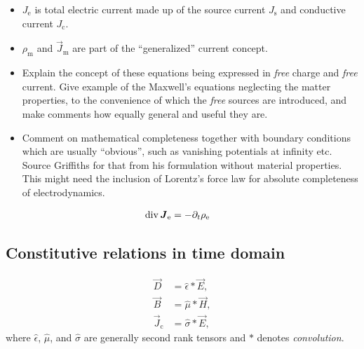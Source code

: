 \documentclass[11pt,a4paper,twoside,openany]{report}
\begin{document}
        \begin{itemize}
            \item $J_{\mathrm e}$ is total electric current made up of the source current $J_{\mathrm s}$ and conductive current $J_{\mathrm c}$. 
            \item $\rho_{\mathrm m}$ and $\vec J_{\mathrm m}$ are part of the \enquote{generalized} current concept.
            \item Explain the concept of these equations being expressed in \emph{free} charge and \emph{free} current. Give example of the Maxwell's equations neglecting the matter properties, to the convenience of which the \emph{free} sources are introduced, and make comments how equally general and useful they are.
            \item Comment on mathematical completeness together with boundary conditions which are usually \enquote{obvious}, such as vanishing potentials at infinity etc. Source Griffiths for that from his formulation without material properties. This might need the inclusion of Lorentz's force law for absolute completeness of electrodynamics.
        \end{itemize}
        
        \begin{align}
            \operatorname{div} \boldsymbol J_{\mathrm{e}} &= -\partial_t\rho_{\mathrm{e}}
        \end{align}

        \subsection{Constitutive relations in time domain}
            \begin{subequations}
                \label{eq:constitutive-relations}
                \begin{align}
                    \label{eq:constitutive-relations-permittivity}
                    \vec D &= \hat\epsilon \ast \vec E,
                \\
                    \label{eq:constitutive-relations-permeability}
                    \vec B &= \hat\mu \ast \vec H,
                \\
                    \label{eq:constitutive-relations-conductivity}
                    \vec J_{\mathrm c} &= \hat\sigma \ast \vec E,
                \end{align}
            \end{subequations}
            where $\hat\epsilon$, $\hat\mu$, and $\hat\sigma$ are generally second rank tensors and $\ast$ denotes \emph{convolution}.
            
\end{document}
